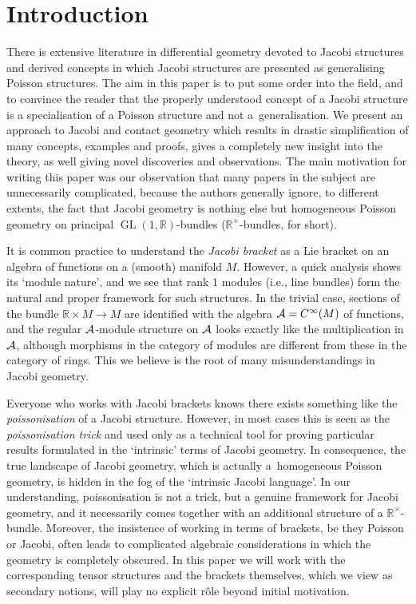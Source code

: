\documentclass[pdftex]{sigma}
\DeclareMathOperator{\GL}{GL}
\newcommand{\R}{{\mathbb R}}
\newcommand{\ti}{\times}
\newcommand{\A}{{\cal A}}
\def\Rt{{\R^\times}}
\numberwithin{equation}{section}
\begin{document}
\section{Introduction}\label{sec:Intro}
There is extensive literature in dif\/ferential geometry devoted to Jacobi structures and derived concepts in which Jacobi structures are presented as generalising Poisson structures. The aim in this paper is to put some order into the f\/ield, and to convince the reader that the properly understood concept of a Jacobi structure is a specialisation of a Poisson structure and not a~ge\-ne\-ralisation. We present an approach to Jacobi and contact geometry which results in drastic simplif\/ication of many concepts, examples and proofs, gives a completely new insight into the theory, as well giving novel discoveries and observations. The main motivation for writing this paper was our observation that many papers in the subject are unnecessarily complicated, because the authors generally ignore, to dif\/ferent extents, the fact that Jacobi geometry is nothing else but homogeneous Poisson geometry on principal $\GL(1,\R)$-bundles ($\Rt$-bundles, for short).

It is common practice to understand the \emph{Jacobi bracket} as a Lie bracket on an algebra of functions on a (smooth) manifold $M$. However, a quick analysis shows its `module nature', and we see that rank $1$ modules (i.e., line bundles) form the natural and proper framework for such structures. In the trivial case, sections of the bundle $\R\ti M\to M$ are identif\/ied with the algebra $\A=C^\infty(M)$ of functions, and the regular $\A$-module structure on $\A$ looks exactly like the multiplication in $\A$, although morphisms in the category of modules are dif\/ferent from these in the category of rings. This we believe is the root of many misunderstandings in Jacobi geometry.

Everyone who works with Jacobi brackets knows there exists something like the \emph{poissonisation} of a Jacobi structure. However, in most cases this is seen as the \emph{poissonisation trick} and used only as a technical tool for proving particular results formulated in the `intrinsic' terms of Jacobi geometry. In consequence, the true landscape of Jacobi geometry, which is actually a~homogeneous Poisson geometry, is hidden in the fog of the `intrinsic Jacobi language'. In our understanding, poissonisation is not a trick, but a genuine framework for Jacobi geometry, and it necessarily comes together with an additional structure of a $\Rt$-bundle. Moreover, the insistence of working in terms of brackets, be they Poisson or Jacobi, often leads to complicated algebraic considerations in which the geometry is completely obscured. In this paper we will work with the corresponding tensor structures and the brackets themselves, which we view as secondary notions, will play no explicit r\^{o}le beyond initial motivation.
\end{document}
